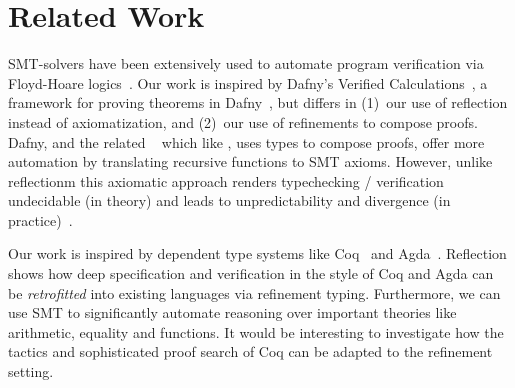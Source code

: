 \section{Related Work}\label{sec:related}



%
SMT-solvers have been extensively used to automate
program verification via Floyd-Hoare logics~\cite{Nelson81}.
%
Our work is inspired by Dafny's Verified
Calculations~\citep{LeinoPolikarpova16},
a framework for proving theorems in
Dafny~\citep{dafny}, but differs in
%
(1)~our use of reflection instead of axiomatization, and
(2)~our use of refinements to compose proofs.
%
Dafny, and the related \fstar~\citep{fstar}
which like \toolname, uses types to compose
proofs, offer more automation by translating
recursive functions to SMT axioms.
However, unlike reflectionm this axiomatic
approach renders typechecking / verification
undecidable (in theory) and leads to
unpredictability and divergence
(in practice)~\citep{Leino16}.





%
Our work is inspired by dependent type
systems like Coq~\citep{coq-book} and
Agda~\citep{agda}.
%
Reflection shows how deep specification
and verification in the style of Coq and Agda
can be \emph{retrofitted} into existing languages
via refinement typing.
%
Furthermore, we can use SMT to significantly
automate reasoning over important theories like
arithmetic, equality and functions.
%
It would be interesting to investigate how
the tactics and sophisticated proof search
of Coq \etc can be adapted to the refinement setting.

